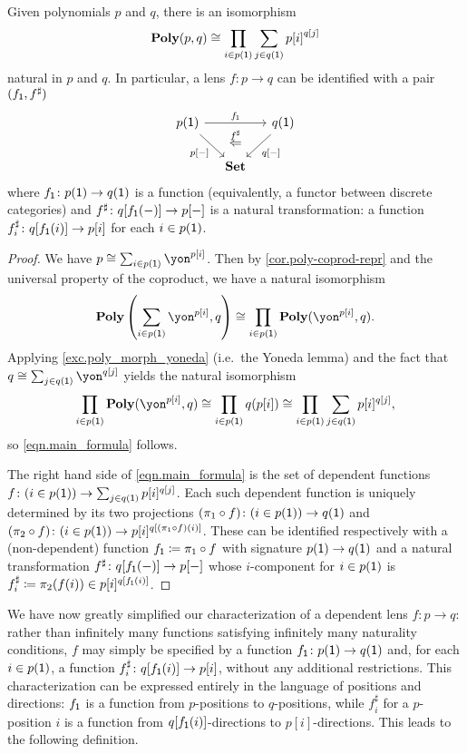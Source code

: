 \documentclass[Book-Poly]{subfiles}
\begin{document}
\begin{proposition}\label{prop.lens-prod-sum}
Given polynomials $p$ and $q$, there is an isomorphism
\begin{equation}\label{eqn.main_formula}
\mathbf{Poly}(p,q)\cong\prod_{i\in p(\textsf{1})}\sum_{j\in q(\textsf{1})}{p[i]}^{q[j]}
\end{equation}
natural in $p$ and $q$.
In particular, a lens $f\colon p\to q$ can be identified with a pair $(f_{\textsf{1}},f^\sharp)$
\begin{equation}\label{eqn.colax_poly_map}
\begin{tikzcd}[column sep=small]
	p(\1)\ar[dr, "p{[-]}"']\ar[rr, "f_\1"]&~&
	q(\1)\ar[dl, "q{[-]}"]\\&
	\smset\ar[u, phantom, near end, "\overset{f^\sharp}{\Leftarrow}"]
\end{tikzcd}
\end{equation}
where $f_{\textsf{1}}\colon p(\textsf{1})\to q(\textsf{1})$ is a function (equivalently, a functor between discrete categories) and $f^\sharp \colon q[f_{\textsf{1}}(-)] \to p[-]$ is a natural transformation: a function $f^\sharp_i\colon q[f_{\textsf{1}}(i)]\to p[i]$ for each $i\in p(\textsf{1})$.
\end{proposition}
\begin{proof}
We have $p\iso\sum_{i\in p(\1)}\yon^{p[i]}$.
Then by \cref{cor.poly-coprod-repr} and the universal property of the coproduct, we have a natural isomorphism
\[
    \poly\left(\sum_{i\in p(\1)}\yon^{p[i]}, q\right) \iso \prod_{i\in p(\1)}\poly(\yon^{p[i]},q).
\]
Applying \cref{exc.poly_morph_yoneda} (i.e.\ the Yoneda lemma) and the fact that $q\iso\sum_{j\in q(\1)}\yon^{q[j]}$ yields the natural isomorphism
\[
  \prod_{i\in p(\1)}\poly(\yon^{p[i]},q) \iso \prod_{i\in p(\1)}q(p[i]) \iso \prod_{i\in p(\1)}\sum_{j\in q(\1)}p[i]^{q[j]},
\]
so \eqref{eqn.main_formula} follows.

The right hand side of \eqref{eqn.main_formula} is the set of dependent functions $f\colon(i\in p(\textsf{1}))\to\sum_{j\in q(\textsf{1})}p[i]^{q[j]}$.
Each such dependent function is uniquely determined by its two projections $(\pi_1\circ f)\colon(i\in p(\textsf{1}))\to q(\textsf{1})$ and $(\pi_2\circ f)\colon(i\in p(\textsf{1}))\to p[i]^{q[(\pi_1\circ f)(i)]}$.
These can be identified respectively with a (non-dependent) function $f_{\textsf{1}}\coloneqq\pi_1\circ f$ with signature $p(\textsf{1})\to q(\textsf{1})$ and a natural transformation $f^\sharp\colon q[f_{\textsf{1}}(-)]\to p[-]$ whose $i$-component for $i\in p(\textsf{1})$ is $f^\sharp_i\coloneqq\pi_2(f(i))\in p[i]^{q[f_{\textsf{1}}(i)]}$.
\end{proof}

We have now greatly simplified our characterization of a dependent lens $f\colon p\to q$: rather than infinitely many functions satisfying infinitely many naturality conditions, $f$ may simply be specified by a function $f_{\textsf{1}}\colon p(\textsf{1})\to q(\textsf{1})$ and, for each $i\in p(\textsf{1})$, a function $f^\sharp_i\colon q[f_{\textsf{1}}(i)]\to p[i]$, without any additional restrictions.
This characterization can be expressed entirely in the language of positions and directions: $f_{\textsf{1}}$ is a function from $p$-positions to $q$-positions, while $f^\sharp_i$ for a $p$-position $i$ is a function from $q[f_{\textsf{1}}(i)]$-directions to $p[i]$-directions.
This leads to the following definition.
\end{document}
